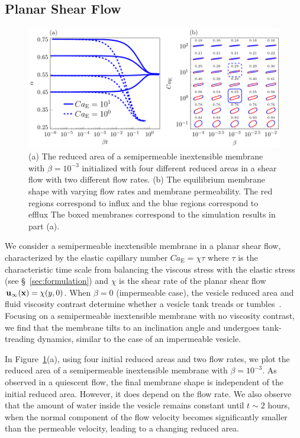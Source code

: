 \documentclass[prb,preprint,showpacs,preprintnumbers,amsmath,amssymb,longbibliography]{revtex4-1}
\newif\ifTikz
\begin{document}
\subsection{Planar Shear Flow}
\begin{figure}[htp]
  \centering
  \ifTikz
  
  \else
  \includegraphics{figures/shearComposite.pdf}
  \fi
  \caption{\label{fig:shearComposite} (a) The reduced area of a
  semipermeable inextensible membrane with $\beta = 10^{-3}$ initialized with four
  different reduced areas in a shear flow with two different flow rates.
  (b) The equilibrium membrane shape with varying flow rates and
  membrane permeability. The red regions correspond to influx and the
  blue regions correspond to efflux The boxed membranes correspond to the
  simulation results in part (a).}
\end{figure}

We consider a semipermeable inextensible membrane in a planar shear flow,
characterized by the elastic capillary number $Ca_\mathrm{E}=\chi\tau$ where $\tau$ is the characteristic time scale from balancing the viscous stress with the elastic stress
(see \S~\ref{sec:formulation}) and $\chi$ is the shear rate of the
planar shear flow $\mathbf{u}_{\infty}(\mathbf{x}) = \chi (y,0)$.  When $\beta=0$
(impermeable case), the vesicle reduced area and fluid viscosity
contrast determine whether a vesicle tank treads or
tumbles~\cite{fin-lam-sei-gom2008, kra-win-sei-lip1996}. Focusing on
a semipermeable inextensible membrane with no viscosity contrast, 
we find that the membrane tilts to an inclination angle and undergoes
tank-treading dynamics, similar to the case of an impermeable vesicle.

In Figure~\ref{fig:shearComposite}(a), using four initial reduced areas
and two flow rates, we plot the reduced area of a semipermeable inextensible membrane
with $\beta = 10^{-3}$. As observed in a quiescent flow, the final
membrane shape is independent of the initial reduced area. However, it
does depend on the flow rate. We also observe that the amount of water
inside the vesicle remains constant until $t\sim 2$ hours, when the
normal component of the flow velocity becomes significantly smaller than
the permeable velocity, leading to a changing reduced area.
\end{document}
